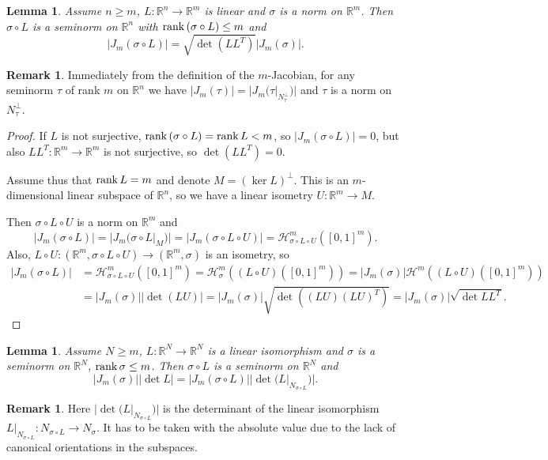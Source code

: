 \documentclass[12pt,leqno]{amsart}
\newtheorem{lemma}[theorem]{Lemma}
\theoremstyle{definition}
\newtheorem{remark}[theorem]{Remark}
\newcommand{\bbbr}{\mathbb R}
\def\H{{\mathcal H}}
\def\rank{{\rm rank\,}}
\numberwithin{theorem}{section} \numberwithin{equation}{section}
\begin{document}
\begin{lemma}
\label{SJT4}
Assume $n\geq m$, $L:\bbbr^n\to\bbbr^m$ is linear and $\sigma$ is a norm on $\bbbr^m$. Then $\sigma\circ L$ is a seminorm on $\bbbr^n$ with $\rank (\sigma\circ L)\leq m$ and
$$
|J_m(\sigma\circ L)|=\sqrt{\det(LL^T)}|J_m(\sigma)|.
$$
\end{lemma}
\begin{remark}
Immediately from the definition of the $m$-Jacobian, for any seminorm $\tau$ of rank $m$ on $\bbbr^n$ we have $|J_m(\tau)|=|J_m(\tau|_{N_\tau^\perp})|$ and $\tau$ is a norm on  $N_\tau^\perp$.
\end{remark}
\begin{proof}
If $L$ is not surjective, $\rank (\sigma\circ L)=\rank L<m$, so $|J_m(\sigma\circ L)|=0$, but also $LL^T:\bbbr^m\to\bbbr^m$ is not surjective, so $\det (LL^T)=0$.

Assume thus that $\rank L=m$ and denote $M=(\ker L)^\perp$. This is an $m$-dimensional linear subspace of $\bbbr^n$, so we have a linear isometry $U:\bbbr^m\to M$.

Then $\sigma\circ L\circ U$ is a norm on $\bbbr^m$ and
$$
|J_m(\sigma\circ L)|=|J_m(\sigma\circ L|_{M})|=|J_m(\sigma\circ L\circ U)|=\H^m_{\sigma\circ L\circ U}([0,1]^m).
$$
Also, $L\circ U:(\bbbr^m,\sigma\circ L\circ U)\to (\bbbr^m, \sigma)$ is an isometry, so
\begin{equation*}
\begin{split}
|J_m(\sigma\circ L)|
&=
\H^m_{\sigma\circ L\circ U}([0,1]^m)=\H^m_\sigma((L\circ U)([0,1]^m))=|J_m(\sigma)|\H^m((L\circ U)([0,1]^m))\\
&=|J_m(\sigma)||\det(LU)|=|J_m(\sigma)|\sqrt{\det\left((LU)(LU)^T\right)}=|J_m(\sigma)|\sqrt{\det LL^T}.
\end{split}
\end{equation*}
\end{proof}
\begin{lemma}
\label{lem:semi11}
Assume $N\geq m$, $L:\bbbr^N\to\bbbr^N$ is a linear isomorphism and $\sigma$ is a seminorm on $\bbbr^N$, $\rank \sigma\leq m$. Then $\sigma\circ L$ is a seminorm on $\bbbr^N$ and
\begin{equation}
\label{eq:lab}
|J_m(\sigma)||\det L|=|J_m(\sigma\circ L)||\det (L|_{N_{\sigma\circ L}})|.
\end{equation}
\end{lemma}
\begin{remark}
Here $|\det (L|_{N_{\sigma\circ L}})|$ is the determinant of the linear isomorphism $L|_{N_{\sigma\circ L}}:N_{\sigma\circ L}\to N_\sigma$. It has to be taken with the absolute value due to the lack of canonical orientations in the subspaces.
\end{remark}
\end{document}
